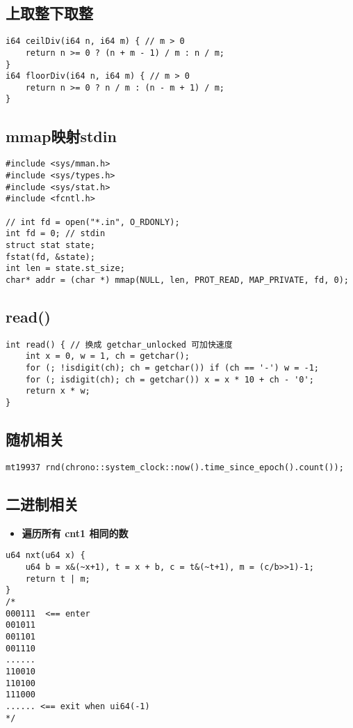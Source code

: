 \documentclass[a4paper,landscape,twocolumn]{ctexart}
\newcommand{\point}[1]{
	\begin{itemize}
		\item \textbf{#1}
	\end{itemize}
}
\begin{document}
\subsection{上取整下取整}

\begin{lstlisting}
i64 ceilDiv(i64 n, i64 m) { // m > 0
	return n >= 0 ? (n + m - 1) / m : n / m;
}
i64 floorDiv(i64 n, i64 m) { // m > 0
	return n >= 0 ? n / m : (n - m + 1) / m;
}
\end{lstlisting}

\subsection{mmap映射stdin}

\begin{lstlisting}
#include <sys/mman.h>
#include <sys/types.h>
#include <sys/stat.h>
#include <fcntl.h>

// int fd = open("*.in", O_RDONLY);
int fd = 0; // stdin
struct stat state;
fstat(fd, &state);
int len = state.st_size;
char* addr = (char *) mmap(NULL, len, PROT_READ, MAP_PRIVATE, fd, 0);
\end{lstlisting}

\subsection{read()}

\begin{lstlisting}
int read() { // 换成 getchar_unlocked 可加快速度
	int x = 0, w = 1, ch = getchar();
	for (; !isdigit(ch); ch = getchar()) if (ch == '-') w = -1;
	for (; isdigit(ch); ch = getchar()) x = x * 10 + ch - '0';
	return x * w;
}
\end{lstlisting}

\subsection{随机相关}

\begin{lstlisting}
mt19937 rnd(chrono::system_clock::now().time_since_epoch().count());
\end{lstlisting}

\subsection{二进制相关}

\point{遍历所有 cnt1 相同的数}

\begin{lstlisting}
u64 nxt(u64 x) {
	u64 b = x&(~x+1), t = x + b, c = t&(~t+1), m = (c/b>>1)-1;
	return t | m;
}
/*
000111  <== enter
001011
001101
001110
......
110010
110100
111000
...... <== exit when ui64(-1)
*/
\end{lstlisting}
\end{document}
